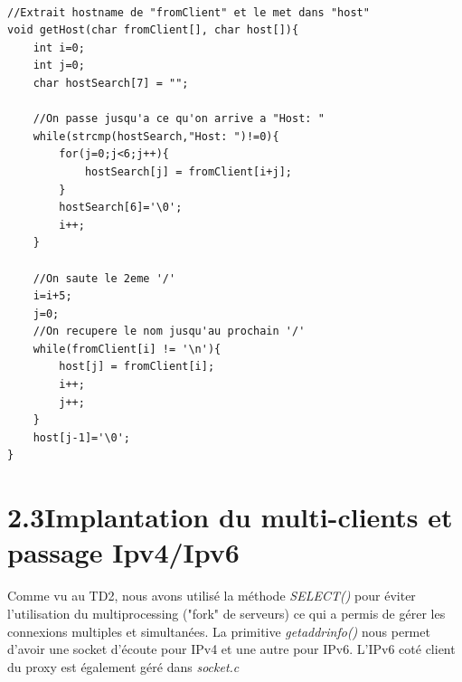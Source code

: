 \documentclass[12pt, a4paper]{report}
\begin{document}
\lstset{language=C}

\renewcommand{\lstlistingname}{Algorithme}
\begin{lstlisting}[caption=Algorithme de détermination d'adresse serveur à contacter (messages.c)]

//Extrait hostname de "fromClient" et le met dans "host"
void getHost(char fromClient[], char host[]){
	int i=0;
	int j=0;
	char hostSearch[7] = "";

	//On passe jusqu'a ce qu'on arrive a "Host: "
	while(strcmp(hostSearch,"Host: ")!=0){
		for(j=0;j<6;j++){
			hostSearch[j] = fromClient[i+j];
		}
		hostSearch[6]='\0';
		i++;
	}
	
	//On saute le 2eme '/'
	i=i+5;
	j=0;
	//On recupere le nom jusqu'au prochain '/'
	while(fromClient[i] != '\n'){
		host[j] = fromClient[i];
		i++;
		j++;
	}
	host[j-1]='\0';
}

\end{lstlisting}

\newpage


\section*{\hspace{0.6cm}2.3\hspace{0.6cm}Implantation du multi-clients et passage Ipv4/Ipv6}
\hspace{1cm} Comme vu au TD2, nous avons utilisé la méthode \textit{SELECT()} pour éviter l'utilisation du multiprocessing ("fork" de serveurs) ce qui a permis de gérer les connexions multiples et simultanées. La primitive \textit{getaddrinfo()} nous permet d'avoir une socket d'écoute pour IPv4 et une autre pour IPv6. L'IPv6 coté client du proxy est également géré dans \textit{socket.c}\\

\lstset{language=C}
\end{document}
